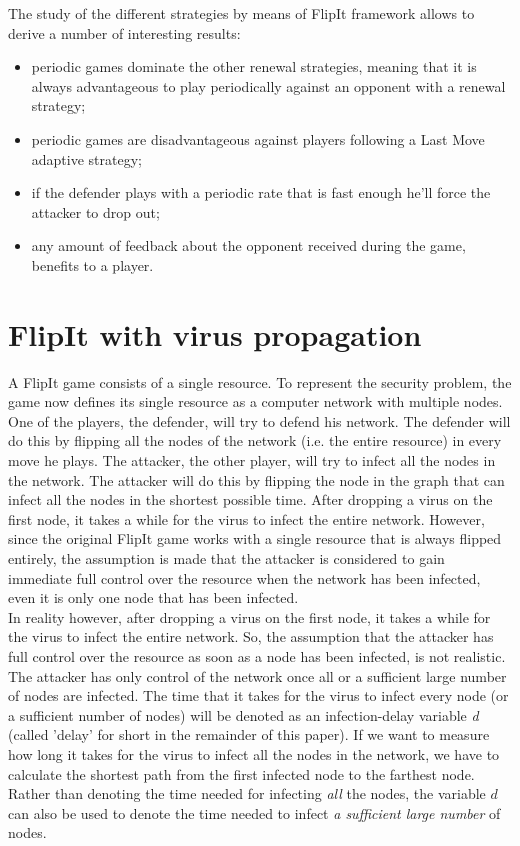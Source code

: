 \documentclass[journal,a4paper]{IEEEtran}
\begin{document}
The study of the different strategies by means of FlipIt framework allows to derive a number of interesting results:  
\begin{itemize}
\item periodic games dominate the other renewal strategies, meaning that it is always advantageous to play periodically against an opponent with a renewal strategy;
\item periodic games are disadvantageous against players following a Last Move adaptive strategy;
\item if the defender plays with a periodic rate that is fast enough he'll force the attacker to drop out;
\item any amount of feedback about the opponent received during the game, benefits to a player.
\end{itemize}
 

\section{FlipIt with virus propagation}
A FlipIt game consists of a single resource. To represent the security problem, the game now defines its single resource as a computer network with multiple
nodes. One of the players, the defender, will try to defend his network. The defender
will do this by flipping all the nodes of the network (i.e. the entire resource) in every move he plays. The
attacker, the other player, will try to infect all the nodes in the network. The attacker
will do this by flipping the node in the graph that can infect all the nodes in the
shortest possible time. After dropping a virus on the first node, it takes a while for the virus to infect the entire network. However, since the original FlipIt game works with a single resource that is always flipped entirely, the assumption is made that the attacker is considered to gain immediate full control over the resource when the network has been infected, even it is only one node that has been infected.\\

In reality however, after dropping a virus on the first node, it takes a while for the virus to infect
the entire network. So, the assumption that the attacker has full control over the resource as soon as a node has been infected, is not realistic. The attacker has only control of the network once all or a sufficient large number of nodes are infected. 
The time that it takes for the virus to infect every node (or a sufficient number of nodes) will be
denoted as an infection-delay variable \textit{d} (called 'delay' for short in the remainder of this paper). If we want to measure how long it takes for the virus to
infect all the nodes in the network, we have to calculate the shortest path from the
first infected node to the farthest node. Rather than denoting the time needed for infecting \textit{all} the nodes, the variable $d$ can also be used to denote the time needed to infect \textit{a sufficient large number} of nodes.
\end{document}
